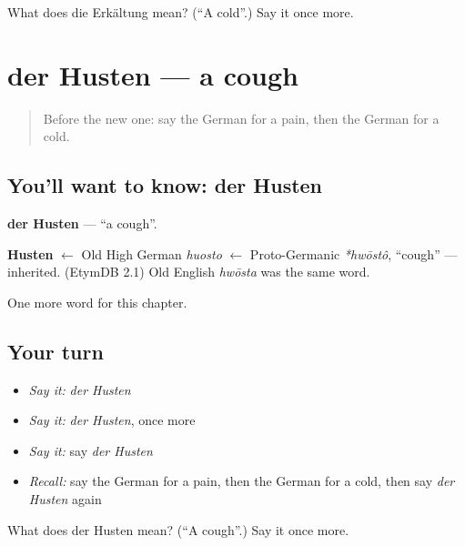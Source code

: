 \begin{tcolorbox}[breakable,colback=teal!4,colframe=teal!35!black,title={Before you move on}]
What does die Erkältung mean? (\textquotedblleft{}A cold\textquotedblright{}.) Say it once more.
\end{tcolorbox}
\section[der Husten]{der Husten — a cough}

\label{lesson:GE-C156-husten}



\begin{quote}
Before the new one: say the German for a pain, then the German for a cold.
\end{quote}

\subsection*{You'll want to know: der Husten}
\textbf{der Husten} — \textquotedblleft{}a cough\textquotedblright{}.

\begin{cousinweb}
\textbf{Husten} $\leftarrow$ Old High German \emph{huosto} $\leftarrow$ Proto-Germanic \emph{*hwōstô}, \textquotedblleft{}cough\textquotedblright{} — inherited. (EtymDB 2.1) Old English \emph{hwōsta} was the same word.
\end{cousinweb}

\begin{grammarlens}[title={What you've built}]
One more word for this chapter.
\end{grammarlens}

\subsection*{Your turn}
\begin{itemize}
\raggedright
  \item \emph{Say it:} \emph{der Husten}
  \item \emph{Say it:} \emph{der Husten}, once more
  \item \emph{Say it:} say \emph{der Husten}
  \item \emph{Recall:} say the German for a pain, then the German for a cold, then say \emph{der Husten} again
\end{itemize}

\begin{tcolorbox}[breakable,colback=teal!4,colframe=teal!35!black,title={Before you move on}]
What does der Husten mean? (\textquotedblleft{}A cough\textquotedblright{}.) Say it once more.
\end{tcolorbox}

